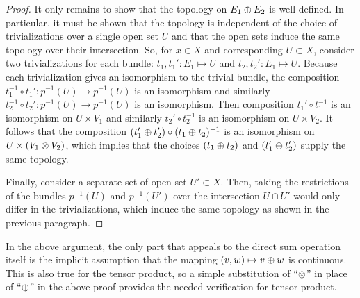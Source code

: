 \documentclass[../../sean_thesis.tex]{subfiles}
\begin{document}
\begin{proof}
It only remains to show that the topology on $E_1 \oplus E_2$ is well-defined. In particular, it must be shown that the topology is independent of the choice of trivializations over a single open set $U$ and that the open sets induce the same topology over their intersection. So, for $x \in X$ and corresponding $U \subset X$, consider two trivializations for each bundle: $t_1, t_1': E_1 \mapsto U$ and $t_2, t_2': E_1 \mapsto U$. Because each trivialization gives an isomorphism to the trivial bundle, the composition $t_1^{-1} \circ t_1': p^{-1}(U) \to p^{-1}(U)$ is an isomorphism and similarly $t_2^{-1} \circ t_2': p^{-1}(U) \to p^{-1}(U)$ is an isomorphism. Then composition $t_1' \circ t_1^{-1}$ is an isomorphism on $U \times V_1$ and similarly $t_2' \circ t_2^{-1}$ is an isomorphism on $U \times V_2$. It follows that the composition $(t_1' \oplus t_2') \circ (t_1 \oplus t_2)^{-1}$ is an isomorphism on $U \times (V_1 \otimes V_2)$, which implies that the choices $(t_1 \oplus t_2)$ and $(t_1' \oplus t_2')$ supply the same topology. 

Finally, consider a separate set of open set $U' \subset X$. Then, taking the restrictions of the bundles $p^{-1}(U)$ and $p^{-1}(U')$ over the intersection $U \cap U'$ would only differ in the trivializations, which induce the same topology as shown in the previous paragraph.
\end{proof}
	
In the above argument, the only part that appeals to the direct sum operation itself is the implicit assumption that the mapping $(v,w) \mapsto v \oplus w$ is continuous. This is also true for the tensor product, so a simple substitution of ``$\otimes$'' in place of ``$\oplus$'' in the above proof provides the needed verification for tensor product.
\end{document}
